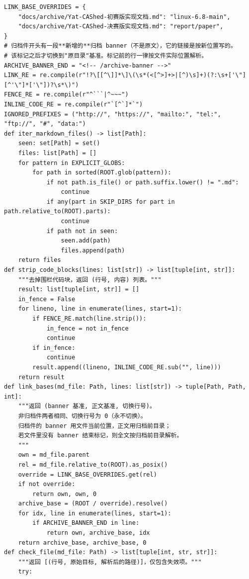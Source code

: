 \documentclass[10pt,a4paper]{article}
\newenvironment{yatpage}{\vspace*{0pt}}{\par}
\begin{document}
\newpage
\begin{yatpage}
\begin{Verbatim}[fontsize=\fontsize{8.2}{9.8}\selectfont]
LINK_BASE_OVERRIDES = {
    "docs/archive/Yat-CAShed-初赛版实现文档.md": "linux-6.8-main",
    "docs/archive/Yat-CAShed-决赛版实现文档.md": "report/paper",
}
# 归档件开头有一段**新增的**归档 banner（不是原文），它的链接是按新位置写的。
# 该标记之后才切换到"原目录"基准。标记前的行一律按文件实际位置解析。
ARCHIVE_BANNER_END = "<!-- /archive-banner -->"
LINK_RE = re.compile(r"!?\[[^\]]*\]\(\s*(<[^>]+>|[^)\s]+)(?:\s+['\"][^'\"]*['\"])?\s*\)")
FENCE_RE = re.compile(r"^```|^~~~")
INLINE_CODE_RE = re.compile(r"`[^`]*`")
IGNORED_PREFIXES = ("http://", "https://", "mailto:", "tel:", "ftp://", "#", "data:")
def iter_markdown_files() -> list[Path]:
    seen: set[Path] = set()
    files: list[Path] = []
    for pattern in EXPLICIT_GLOBS:
        for path in sorted(ROOT.glob(pattern)):
            if not path.is_file() or path.suffix.lower() != ".md":
                continue
            if any(part in SKIP_DIRS for part in path.relative_to(ROOT).parts):
                continue
            if path not in seen:
                seen.add(path)
                files.append(path)
    return files
def strip_code_blocks(lines: list[str]) -> list[tuple[int, str]]:
    """去掉围栏代码块，返回 (行号, 内容) 列表。"""
    result: list[tuple[int, str]] = []
    in_fence = False
    for lineno, line in enumerate(lines, start=1):
        if FENCE_RE.match(line.strip()):
            in_fence = not in_fence
            continue
        if in_fence:
            continue
        result.append((lineno, INLINE_CODE_RE.sub("", line)))
    return result
def link_bases(md_file: Path, lines: list[str]) -> tuple[Path, Path, int]:
    """返回 (banner 基准, 正文基准, 切换行号)。
    非归档件两者相同、切换行号为 0（永不切换）。
    归档件的 banner 用文件当前位置，正文用归档前目录；
    若文件里没有 banner 结束标记，则全文按归档前目录解析。
    """
    own = md_file.parent
    rel = md_file.relative_to(ROOT).as_posix()
    override = LINK_BASE_OVERRIDES.get(rel)
    if not override:
        return own, own, 0
    archive_base = (ROOT / override).resolve()
    for idx, line in enumerate(lines, start=1):
        if ARCHIVE_BANNER_END in line:
            return own, archive_base, idx
    return archive_base, archive_base, 0
def check_file(md_file: Path) -> list[tuple[int, str, str]]:
    """返回 [(行号, 原始目标, 解析后的路径)]，仅包含失效项。"""
    try:
\end{Verbatim}
\end{yatpage}
\end{document}
